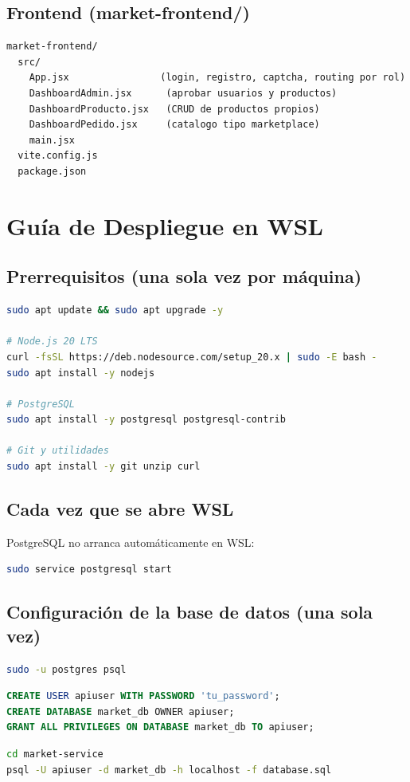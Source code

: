 \documentclass[11pt,a4paper]{article}
\begin{document}
\subsection{Frontend (market-frontend/)}
\begin{lstlisting}
market-frontend/
  src/
    App.jsx                (login, registro, captcha, routing por rol)
    DashboardAdmin.jsx      (aprobar usuarios y productos)
    DashboardProducto.jsx   (CRUD de productos propios)
    DashboardPedido.jsx     (catalogo tipo marketplace)
    main.jsx
  vite.config.js
  package.json
\end{lstlisting}
 
\section{Guía de Despliegue en WSL}
 
\subsection{Prerrequisitos (una sola vez por máquina)}
\begin{lstlisting}[language=bash]
sudo apt update && sudo apt upgrade -y
 
# Node.js 20 LTS
curl -fsSL https://deb.nodesource.com/setup_20.x | sudo -E bash -
sudo apt install -y nodejs
 
# PostgreSQL
sudo apt install -y postgresql postgresql-contrib
 
# Git y utilidades
sudo apt install -y git unzip curl
\end{lstlisting}
 
\subsection{Cada vez que se abre WSL}
PostgreSQL no arranca automáticamente en WSL:
\begin{lstlisting}[language=bash]
sudo service postgresql start
\end{lstlisting}
 
\subsection{Configuración de la base de datos (una sola vez)}
\begin{lstlisting}[language=bash]
sudo -u postgres psql
\end{lstlisting}
\begin{lstlisting}[language=SQL]
CREATE USER apiuser WITH PASSWORD 'tu_password';
CREATE DATABASE market_db OWNER apiuser;
GRANT ALL PRIVILEGES ON DATABASE market_db TO apiuser;
\end{lstlisting}
\begin{lstlisting}[language=bash]
cd market-service
psql -U apiuser -d market_db -h localhost -f database.sql
\end{lstlisting}
 
\end{document}
